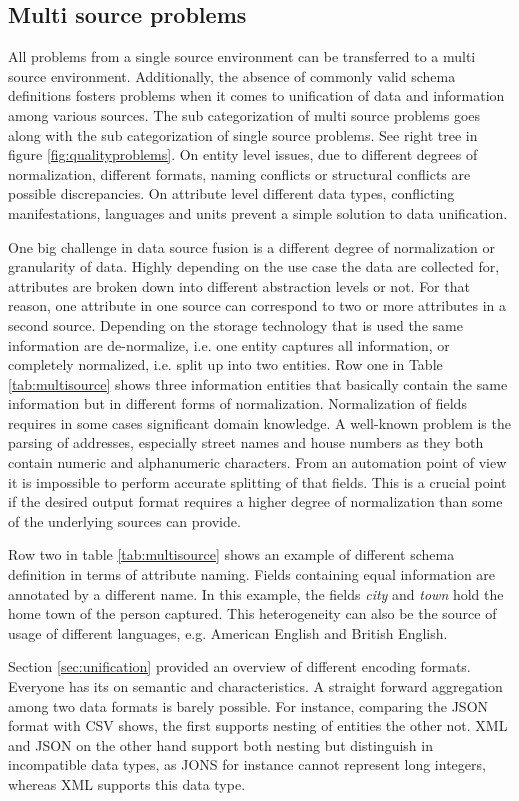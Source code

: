 \subsection{Multi source problems}
All problems from a single source environment can be transferred to a multi source environment. Additionally, the absence of commonly valid schema definitions fosters problems when it comes to unification of data and information among various sources. The sub categorization of multi source problems goes along with the sub categorization of single source problems. See right tree in figure \ref{fig:qualityproblems}. On entity level issues, due to different degrees of normalization, different formats, naming conflicts or structural conflicts are possible discrepancies. On attribute level different data types, conflicting manifestations, languages and units prevent a simple solution to data unification.

One big challenge in data source fusion is a different degree of normalization or granularity of data. Highly depending on the use case the data are collected for, attributes are broken down into different abstraction levels or not. For that reason, one attribute in one source can correspond to two or more attributes in a second source. Depending on the storage technology that is used the same information are de-normalize, i.e. one entity captures all information, or completely normalized, i.e. split up into two entities. Row one in Table \ref{tab:multisource} shows three information entities that basically contain the same information but in different forms of normalization. Normalization of fields requires in some cases significant domain knowledge. A well-known problem is the parsing of addresses, especially street names and house numbers as they both contain numeric and alphanumeric characters. From an automation point of view it is impossible to perform accurate splitting of that fields. This is a crucial point if the desired output format requires a higher degree of normalization than some of the underlying sources can provide. 

Row two in table \ref{tab:multisource} shows an example of different schema definition in terms of attribute naming. Fields containing equal information are annotated by a different name. In this example, the fields \textit{city} and \textit{town} hold the home town of the person captured. This heterogeneity can also be the source of usage of different languages, e.g. American English and British English. 

Section \ref{sec:unification} provided an overview of different encoding formats. Everyone has its on semantic and characteristics. A straight forward aggregation among two data formats is barely possible. For instance, comparing the JSON \cite{json_2017} format with CSV shows, the first supports nesting of entities the other not. XML \cite{xml_2017} and JSON on the other hand support both nesting but distinguish in incompatible data types, as JONS for instance cannot represent long integers, whereas XML supports this data type.

